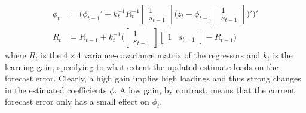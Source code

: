 \documentclass[11pt]{article}
\renewcommand{\[}{\begin{equation}}
\renewcommand{\]}{\end{equation}}
\begin{document}
\begin{align}
\phi_t  & = \bigg( \phi_{t-1}' + k_t^{-1} R_t^{-1}\begin{bmatrix} 1 \\ s_{t-1} \end{bmatrix}\bigg(z_{t} - \phi_{t-1} \begin{bmatrix} 1 \\ s_{t-1} \end{bmatrix} \bigg)' \bigg)' \\
R_t &= R_{t-1} +  k_t^{-1} \bigg( \begin{bmatrix} 1 \\ s_{t-1} \end{bmatrix} \begin{bmatrix} 1 & s_{t-1} \end{bmatrix}  - R_{t-1} \bigg)
\end{align}
where $R_t$ is the $4\times 4$ variance-covariance matrix of the regressors and $k_t$ is the learning gain, specifying to what extent the updated estimate loads on the forecast error. Clearly, a high gain implies high loadings and thus strong changes in the estimated coefficients $\phi$. A low gain, by contrast, means that the current forecast error only has a small effect on $\phi_t$.
\end{document}

